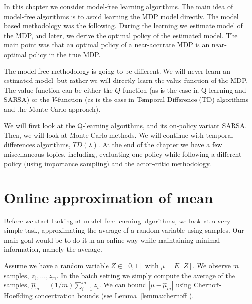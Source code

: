 In this chapter we consider model-free learning algorithms. The main
idea of model-free algorithms is to avoid learning the MDP model
directly. The model based methodology was the following. During the
learning we estimate model of the MDP, and later,  we derive the
optimal policy of the estimated model. The main point was that an
optimal policy of a near-accurate MDP is an near-optimal policy in
the true MDP.

The model-free methodology is going to be different. We will never
learn an estimated model, but rather we will directly learn the
value function of the MDP. The value function can be either the
$Q$-function (as is the case in Q-learning and SARSA) or the
$V$-function (as is the case in Temporal Difference (TD) algorithms
and the Monte-Carlo approach).

We will first look at the Q-learning algorithms, and its on-policy
variant SARSA. Then, we will look at Monte-Carlo methods. We will
continue with temporal differences algorithms, $TD(\lambda)$. At the
end of the chapter we have a few miscellaneous topics, including,
evaluating one policy while following a different policy (using
importance sampling) and the actor-critic methodology.



\section{Online approximation of mean}

Before we start looking at model-free learning algorithms, we look
at a very simple task, approximating the average of a random
variable using samples. Our main goal would be to do it in an online
way while maintaining minimal information, namely the average.

Assume we have a random variable $Z\in [0,1]$ with $\mu=E[Z]$. We
observe $m$ samples, $z_1, \ldots , z_m$. In the batch setting we
simply compute the average of the samples,
$\widehat{\mu}_m=(1/m)\sum_{i=1}^m z_i$. We can bound
$|\mu-\widehat{\mu}_m|$ using Chernoff-Hoeffding concentration
bounds (see Lemma~\ref{lemma:chernoff}).

